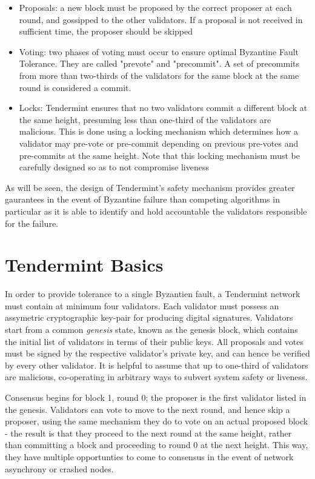 \begin{itemize}

\item{Proposals: a new block must be proposed by the correct proposer at each round, and gossipped to the other validators. If a proposal is not received in sufficient time, the proposer should be skipped}

\item{Voting: two phases of voting must occur to ensure optimal Byzantine Fault Tolerance. They are called "prevote" and "precommit". A set of precommits from more than two-thirds of the validators for the same block at the same round is considered a commit.}

\item{Locks: Tendermint ensures that no two validators commit a different block at the same height, presuming less than one-third of the validators are malicious. This is done using a locking mechanism which determines how a validator may pre-vote or pre-commit depending on previous pre-votes and pre-commits at the same height. Note that this locking mechanism must be carefully designed so as to not compromise liveness}

\end{itemize}

As will be seen, the design of Tendermint's safety mechanism provides greater gaurantees in the event of Byzantine failure than competing algorithms
in particular as it is able to identify and hold accountable the validators responsible for the failure.

\section{Tendermint Basics}

In order to provide tolerance to a single Byzantien fault, a Tendermint network must contain at minimum four validators.
Each validator must possess an assymetric cryptographic key-pair for producing digital signatures.
Validators start from a common \emph{genesis} state, known as the genesis block, which contains the initial list of validators in terms of their public keys.
All proposals and votes must be signed by the respective validator's private key, and can hence be verified by every other validator.
It is helpful to assume that up to one-third of validators are malicious, co-operating in arbitrary ways to subvert system safety or liveness.

Consensus begins for block 1, round 0; the proposer is the first validator listed in the genesis.
Validators can vote to move to the next round, and hence skip a proposer, using the same mechanism they do to vote on an actual proposed block - 
the result is that they proceed to the next round at the same height, rather than committing a block and proceeding to round 0 at the next height.
This way, they have multiple opportunties to come to consensus in the event of network asynchrony or crashed nodes.

